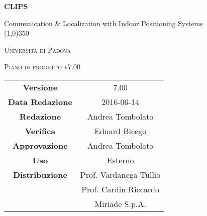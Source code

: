 \documentclass[a4paper,12pt]{article}
\author{Eduard Bicego, Federico Tavella, Andrea Tombolato}
\date{20/01/2016}
\begin{document}
	\begin{titlepage}
		\centering
		{\huge\bfseries CLIPS\par}
		Communication \& Localization with Indoor Positioning Systems \\
		\line(1,0){350} \\
		{\scshape\LARGE Università di Padova \par}
		\vspace{1cm}
		{\scshape\Large Piano di progetto v7.00\par}
		\logo
	
		\vfill \vfill
		\begin{tabular}{c|c}
			{\hfill \textbf{Versione}} 		& 7.00				\\
			{\hfill\textbf{Data Redazione}} 	& 2016-06-14			\\
			{\hfill\textbf{Redazione}} 		& Andrea Tombolato		\\
			{\hfill\textbf{Verifica}} 		& Eduard Bicego 		\\
			{\hfill\textbf{Approvazione}} 		&  	Andrea Tombolato	\\
			{\hfill\textbf{Uso}} 			& Esterno			\\
			{\hfill\textbf{Distribuzione}} 		& Prof. Vardanega Tullio 	\\
								& Prof. Cardin Riccardo 	\\
								& Miriade S.p.A. 		\\
	\end{tabular}
\end{titlepage}

	\pagestyle{myfront}	
	
	\newpage
			
	\newpage
		\tableofcontents 	%
	\newpage
		\listoftables 		%
	\newpage	
		\listoffigures		%
	
	\label{LastFrontPage}

	\newpage
		\pagestyle{mymain}
	
	\newpage
		
	\newpage
		

	\newpage
		
		
	\newpage
		
		
	\newpage
			

    \newpage
		
		
	\newpage
		
		
        		
	\label{LastPage}
\end{document}
